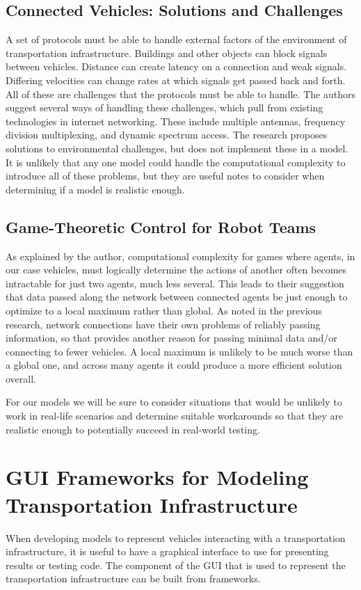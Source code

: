 \documentclass[10pt,letterpaper,draftclsnofoot,onecolumn]{IEEEtran}
\begin{document}
\subsection{Connected Vehicles: Solutions and Challenges \cite{lu2014connected}}
A set of protocols must be able to handle external factors of the environment of transportation infrastructure. Buildings and other objects can block signals between vehicles. Distance can create latency on a connection and weak signals. Differing velocities can change rates at which signals get passed back and forth. All of these are challenges that the protocols must be able to handle. The authors suggest several ways of handling these challenges, which pull from existing technologies in internet networking. These include multiple antennas, frequency division multiplexing, and dynamic spectrum access. The research proposes solutions to environmental challenges, but does not implement these in a model. It is unlikely that any one model could handle the computational complexity to introduce all of these problems, but they are useful notes to consider when determining if a model is realistic enough.
\subsection{Game-Theoretic Control for Robot Teams \cite{emery2005game}}
As explained by the author, computational complexity for games where agents, in our case vehicles, must logically determine the actions of another often becomes intractable for just two agents, much less several. This leads to their suggestion that data passed along the network between connected agents be just enough to optimize to a local maximum rather than global. As noted in the previous research, network connections have their own problems of reliably passing information, so that provides another reason for passing minimal data and/or connecting to fewer vehicles. A local maximum is unlikely to be much worse than a global one, and across many agents it could produce a more efficient solution overall.

For our models we will be sure to consider situations that would be unlikely to work in real-life scenarios and determine suitable workarounds so that they are realistic enough to potentially succeed in real-world testing.
\section{GUI Frameworks for Modeling Transportation Infrastructure}
When developing models to represent vehicles interacting with a transportation infrastructure, it is useful to have a graphical interface to use for presenting results or testing code. The component of the GUI that is used to represent the transportation infrastructure can be built from frameworks.
\end{document}
